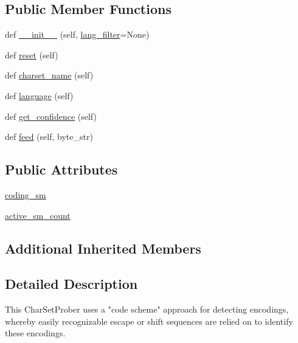 \subsection*{Public Member Functions}
\begin{DoxyCompactItemize}
\item 
def \hyperlink{classpip_1_1__vendor_1_1chardet_1_1escprober_1_1EscCharSetProber_ab35eaee0c7f07c5569104d0ae7a133ab}{\+\_\+\+\_\+init\+\_\+\+\_\+} (self, \hyperlink{classpip_1_1__vendor_1_1chardet_1_1charsetprober_1_1CharSetProber_aa0806228646298c509357287bcda15da}{lang\+\_\+filter}=None)
\item 
def \hyperlink{classpip_1_1__vendor_1_1chardet_1_1escprober_1_1EscCharSetProber_a105abff32907608981376c927adc3df2}{reset} (self)
\item 
def \hyperlink{classpip_1_1__vendor_1_1chardet_1_1escprober_1_1EscCharSetProber_a193a148ab5b4f8202b64ea4cf78afa54}{charset\+\_\+name} (self)
\item 
def \hyperlink{classpip_1_1__vendor_1_1chardet_1_1escprober_1_1EscCharSetProber_a1768393ac33fa52ebdce13a8a471e2a5}{language} (self)
\item 
def \hyperlink{classpip_1_1__vendor_1_1chardet_1_1escprober_1_1EscCharSetProber_a09a580e3aa3d6b10cbd23dc74b112b38}{get\+\_\+confidence} (self)
\item 
def \hyperlink{classpip_1_1__vendor_1_1chardet_1_1escprober_1_1EscCharSetProber_a9a4b36b24c3a8622cbd3f4eeadfeffc4}{feed} (self, byte\+\_\+str)
\end{DoxyCompactItemize}
\subsection*{Public Attributes}
\begin{DoxyCompactItemize}
\item 
\hyperlink{classpip_1_1__vendor_1_1chardet_1_1escprober_1_1EscCharSetProber_ad49985317589b8705d138dbc86cec287}{coding\+\_\+sm}
\item 
\hyperlink{classpip_1_1__vendor_1_1chardet_1_1escprober_1_1EscCharSetProber_a6971b62e2802136bdddb9d841bed6cfc}{active\+\_\+sm\+\_\+count}
\end{DoxyCompactItemize}
\subsection*{Additional Inherited Members}


\subsection{Detailed Description}
\begin{DoxyVerb}This CharSetProber uses a "code scheme" approach for detecting encodings,
whereby easily recognizable escape or shift sequences are relied on to
identify these encodings.
\end{DoxyVerb}
 

